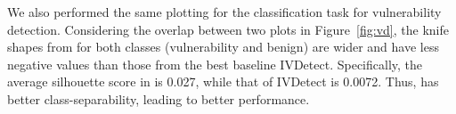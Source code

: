 We also performed the same plotting for the classification task for
vulnerability detection. Considering the overlap between two plots in
Figure~\ref{fig:vd}, the knife shapes from {\tool} for both classes
(vulnerability and benign) are wider and have less negative values
than those from the best baseline IVDetect. Specifically, the average
silhouette score in {\tool} is 0.027, while that of IVDetect is
0.0072. Thus, {\tool} has better class-separability, leading to better
performance.
